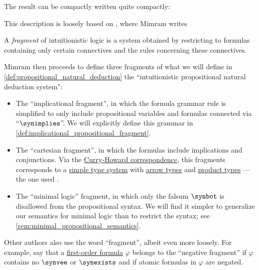 \begin{concept}
  The result can be compactly written quite compactly:
  \begin{bnf*}
                { \bnfor {} \bnfsp \bnftsq{\( \synimplies \)} \bnfsp {}}
  \end{bnf*}
\end{concept}
\begin{comments}
  \item This description is loosely based on \cite[\S 2.2.6]{Mimram2020ProgramEqualsProof}, where Mimram writes
  \begin{displayquote}
    A \textit{fragment} of intuitionistic logic is a system obtained by restricting to formulas containing only certain connectives and the rules concerning these connectives.
  \end{displayquote}

  Mimram then proceeds to define three fragments of what we will define in \cref{def:propositional_natural_deduction} the \enquote{intuitionistic propositional natural deduction system}:
  \begin{itemize}
    \item The \enquote{implicational fragment}, in which the formula grammar rule is simplified to only include propositional variables and formulas connected via \enquote{\( \synimplies \)}. We will explicitly define this grammar in \cref{def:implicational_propositional_fragment}.

    \item The \enquote{cartesian fragment}, in which the formulas include implications and conjunctions. Via the \hyperref[con:curry_howard_correspondence]{Curry-Howard correspondence}, this fragments corresponds to a \hyperref[def:simple_type_system]{simple type system} with \hyperref[def:arrow_type]{arrow types} and \hyperref[def:simple_product_type]{product types} --- the one used \cite{GirardEtAl1989ProofsAndTypes}.

    \item The \enquote{minimal logic} fragment, in which only the falsum \( \synbot \) is disallowed from the propositional syntax. We will find it simpler to generalize our semantics for minimal logic than to restrict the syntax; see \cref{rem:minimal_propositional_semantics}.
  \end{itemize}

  Other authors also use the word \enquote{fragment}, albeit even more loosely. For example, \textcite[def. 2.3.1]{TroelstraSchwichtenberg2000BasicProofTheory} say that a \hyperref[def:fol_formula]{first-order formula} \( \varphi \) belongs to the \enquote{negative fragment} if \( \varphi \) contains no \( \synvee \) or \( \synexists \) and if atomic formulas in \( \varphi \) are negated.
\end{comments}

